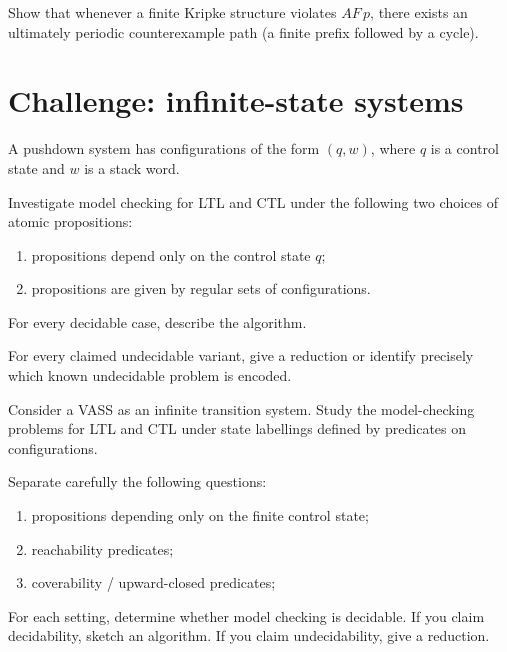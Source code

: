 \documentclass[11pt,a4paper]{tutorial}
\begin{document}
\begin{unfinished}
\begin{exercise}
Show that whenever a finite Kripke structure violates $AF\,p$, there exists an
ultimately periodic counterexample path (a finite prefix followed by a cycle).
\end{exercise}


\section{Challenge: infinite-state systems}

\begin{exercise}
A pushdown system has configurations of the form $(q,w)$, where $q$ is a
control state and $w$ is a stack word.

Investigate model checking for LTL and CTL under the following two choices of
atomic propositions:

\begin{enumerate}[label=(\alph*)]
  \item propositions depend only on the control state $q$;
  \item propositions are given by regular sets of configurations.
\end{enumerate}

For every decidable case, describe the algorithm.

For every claimed undecidable variant, give a reduction or identify precisely
which known undecidable problem is encoded.
\end{exercise}


\begin{exercise}
Consider a VASS as an infinite transition system.  Study the model-checking
problems for LTL and CTL under state labellings defined by predicates on
configurations.

Separate carefully the following questions:

\begin{enumerate}[label=(\alph*)]
  \item propositions depending only on the finite control state;
  \item reachability predicates;
  \item coverability / upward-closed predicates;
\end{enumerate}

For each setting, determine whether model checking is decidable.
If you claim decidability, sketch an algorithm.
If you claim undecidability, give a reduction.


\end{exercise}
\end{unfinished}
\end{document}
